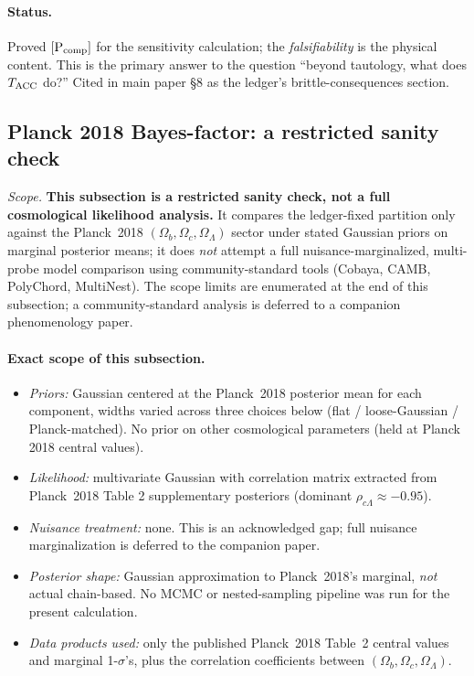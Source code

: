 \documentclass[11pt]{article}
\theoremstyle{plain}
\theoremstyle{definition}
\theoremstyle{remark}
\begin{document}
\paragraph{Status.}  Proved $[\text{P}_{\rm comp}]$ for the sensitivity calculation; the \emph{falsifiability} is the physical content.  This is the primary answer to the question ``beyond tautology, what does $T_{\rm ACC}$ do?''  Cited in main paper \S8 as the ledger's brittle-consequences section.

\bigskip

\subsection{Planck 2018 Bayes-factor: a restricted sanity check}\label{supp:Iprime4}

\noindent\textit{Scope.}  \textbf{This subsection is a restricted sanity check, not a full cosmological likelihood analysis.}  It compares the ledger-fixed partition only against the Planck~2018 $(\Omega_b, \Omega_c, \Omega_\Lambda)$ sector under stated Gaussian priors on marginal posterior means; it does \emph{not} attempt a full nuisance-marginalized, multi-probe model comparison using community-standard tools (Cobaya, CAMB, PolyChord, MultiNest).  The scope limits are enumerated at the end of this subsection; a community-standard analysis is deferred to a companion phenomenology paper.

\paragraph{Exact scope of this subsection.}
\begin{itemize}[leftmargin=2em,itemsep=1pt,topsep=2pt]
  \item \emph{Priors:} Gaussian centered at the Planck~2018 posterior mean for each component, widths varied across three choices below (flat / loose-Gaussian / Planck-matched).  No prior on other cosmological parameters (held at Planck 2018 central values).
  \item \emph{Likelihood:} multivariate Gaussian with correlation matrix extracted from Planck~2018 Table 2 supplementary posteriors (dominant $\rho_{c\Lambda} \approx -0.95$).
  \item \emph{Nuisance treatment:} none.  This is an acknowledged gap; full nuisance marginalization is deferred to the companion paper.
  \item \emph{Posterior shape:} Gaussian approximation to Planck~2018's marginal, \emph{not} actual chain-based.  No MCMC or nested-sampling pipeline was run for the present calculation.
  \item \emph{Data products used:} only the published Planck~2018 Table~2 central values and marginal 1-$\sigma$'s, plus the correlation coefficients between $(\Omega_b, \Omega_c, \Omega_\Lambda)$.
\end{itemize}
\end{document}
